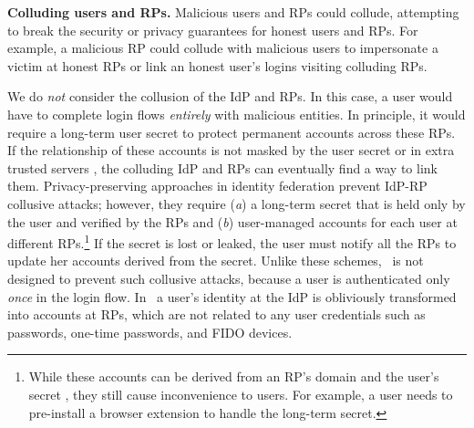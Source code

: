 \noindent \textbf{Colluding users and RPs.}
Malicious users and RPs could collude,
 attempting to break the security or privacy guarantees for honest users and RPs.
For example, a malicious RP could collude with malicious users to %
 impersonate a victim at honest RPs or link an honest user's logins visiting colluding RPs.

We do \emph{not} consider the collusion of the IdP and RPs.
In this case, a user would have to complete login flows \emph{entirely} with malicious entities. 
In principle, it would require a long-term user secret to protect permanent accounts across these RPs.
If the relationship of these accounts is not masked by the user secret or in extra trusted servers \cite{miso},
 the colluding IdP and RPs can eventually find a way to link them.
Privacy-preserving approaches in identity federation \cite{ELPASSO, UnlimitID, idemix, PseudoID, Opaak, uprov} prevent IdP-RP collusive attacks;
however, they require (\emph{a}) a long-term secret that is held only by the user and verified by the RPs and (\emph{b}) user-managed accounts for each user at different RPs.\footnote{While these accounts can be derived from an RP's domain and the user's secret \cite{ELPASSO, UnlimitID, Opaak, uprov,idemix},
 they still cause inconvenience to users.
For example, a user needs to pre-install a browser extension to handle the long-term secret.}
If the secret is lost or leaked, the user must notify all the RPs to update her accounts derived from the secret.
Unlike these schemes, \usso\ is not designed to prevent such collusive attacks,
 because a user is authenticated only \emph{once} in the login flow.
In \usso\ a user's identity at the IdP is obliviously transformed into accounts at RPs,
 which are not related to any user credentials such as passwords, one-time passwords, %
  and FIDO devices.


